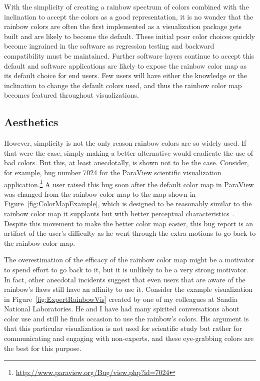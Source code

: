 \documentclass[letterpaper,twocolumn,fleqn]{article}
\newcommand*{\lcite}[1]{~\cite{#1}}
\begin{document}
With the simplicity of creating a rainbow spectrum of colors combined with
the inclination to accept the colors as a good representation, it is no
wonder that the rainbow colors are often the first implemented as a
visualization package gets built and are likely to become the default.
These initial poor color choices quickly become ingrained in the software
as regression testing and backward compatibility must be maintained.
Further software layers continue to accept this default and software
applications are likely to expose the rainbow color map as its default
choice for end users. Few users will have either the knowledge or the
inclination to change the default colors used, and thus the rainbow color
map becomes featured throughout visualizations.

\subsection{Aesthetics}

\noindent
However, simplicity is not the only reason rainbow colors are so widely
used. If that were the case, simply making a better alternative would
eradicate the use of bad colors. But this, at least anecdotally, is shown
not to be the case. Consider, for example, bug number 7024 for the ParaView
scientific visualization
application.\footnote{\url{http://www.paraview.org/Bug/view.php?id=7024}} A
user raised this bug soon after the default color map in ParaView was
changed from the rainbow color map to the map shown in
Figure~\ref{fig:ColorMapExample}, which is designed to be reasonably
similar to the rainbow color map it supplants but with better perceptual
characteristics\lcite{Moreland2009}. Despite this movement to make the
better color map easier, this bug report is an artifact of the user's
difficulty as he went through the extra motions to go back to the rainbow
color map.

The overestimation of the efficacy of the rainbow color map might be a
motivator to spend effort to go back to it, but it is unlikely to be a very
strong motivator. In fact, other anecdotal incidents suggest that even users
that are aware of the rainbow's flaws still have an affinity to use it.
Consider the example visualization in Figure~\ref{fig:ExpertRainbowVis}
created by one of my colleagues at Sandia National Laboratories. He and I
have had many spirited conversations about color use and still he finds
occasion to use the rainbow's colors. His argument is that this particular
visualization is not used for scientific study but rather for communicating
and engaging with non-experts, and these eye-grabbing colors are the best
for this purpose.
\end{document}
